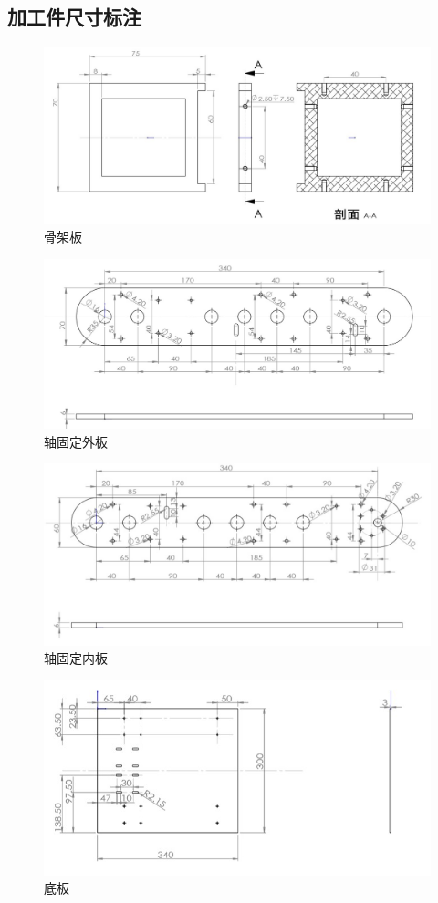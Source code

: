 \documentclass[12pt]{article}
\begin{document}
\begin{CJK}{UTF8}{gbsn}
\subsection{加工件尺寸标注}
 \begin{figure}[H]
\centering
\includegraphics[width=.9\textwidth]{chap4//Fig1.jpg}
\caption{骨架板}
\end{figure}
 \begin{figure}[H]
\centering
\includegraphics[width=.9\textwidth]{chap4//Fig2.jpg}
\caption{轴固定外板}
\end{figure}
 \begin{figure}[H]
\centering
\includegraphics[width=.9\textwidth]{chap4//Fig3.jpg}
\caption{轴固定内板}
\end{figure}
 \begin{figure}[H]
\centering
\includegraphics[width=.9\textwidth]{chap4//Fig4.jpg}
\caption{底板}
\end{figure}

\end{CJK}
\end{document}
